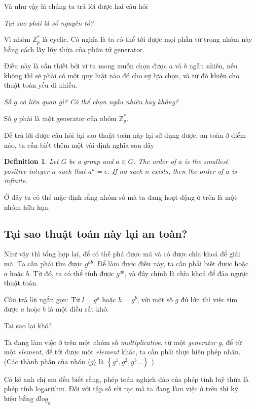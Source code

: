 \documentclass[a4paper,12pt]{article}
\newtheorem{definition}{Definition}[section]
\newenvironment{fdefinition}
    {\begin{mdframed}\begin{definition}}
    {\end{definition}\end{mdframed}}
\begin{document}
Và như vậy là chúng ta trả lời được hai câu hỏi

\emph{Tại sao phải là số nguyên tố? }

Vì nhóm $\mathbb{Z}_p^*$ là cyclic. Có nghĩa là ta có thể tới được
mọi phần tử trong nhóm này bằng cách lấy lũy thừa của phần tử generator.

Điều này là cần thiết bởi vì ta mong muốn chọn được $a$ và $b$ ngẫu nhiên, nếu không thì
sẽ phải có một quy luật nào đó cho sự lựa chọn, và từ đó khiến cho thuật toán yếu đi nhiều.

\emph{Số $g$ có liên quan gì? Có thể chọn ngẫu nhiên hay không?}

Số $g$ phải là một generator của nhóm $\mathbb{Z}_p^*$.

Để trả lời được câu hỏi tại sao thuật toán này lại sử dụng được,
an toàn ở điểm nào, ta cần biết thêm một vài định nghĩa sau đây

\begin{fdefinition}
    Let $G$ be a group and $a \in G$. The order of $a$ is the smallest positive integer $n$ such that $a^n = e$.
    If no such $n$ exists, then the order of $a$ is infinite.
\end{fdefinition}

Ở đây ta có thể mặc định rằng nhóm số mà ta đang hoạt động ở trên là một nhóm hữu hạn.

\subsection*{Tại sao thuật toán này lại an toàn?}

Như vậy thì tổng hợp lại, để có thế phá được mã và có được chìa khoá để
giải mã. Ta cần phải tìm được $g^{ab}$. Để làm được điều này, ta cần phải biết được
hoặc \(a\) hoặc \(b\). Từ đó, ta có thể tính được \(g^{ab}\), và đây chính là chìa khoá
để đảo ngược thuật toán.

Câu trả lời ngắn gọn: Từ \(l = g^a\)  hoặc \(h = g^b\), với một số \(g\) đủ lớn thì
việc tìm được \(a\) hoặc \(b\) là một điều rất khó.

Tại sao lại khó?

Ta đang làm việc ở trên một nhóm số \emph{multiplicative}, từ một \emph{generator} \(g\),
để từ một \emph{element}, để tới được một \emph{element} khác, ta cần phải thực hiện
phép nhân. (Các thành phần của nhón \(\langle g \rangle\) là \(\left\{g^1, g^2, g^3 \dots \right\}\) )

Có kẽ anh chị em đều biết rằng, phép toán nghịch đảo của phép tính luỹ thừa
là phép tính logarithm. Đối với tập số rời rạc mà ta đang làm việc ở trên thì
ký hiệu bằng \(dlog_g\)
\end{document}
